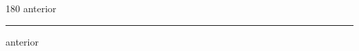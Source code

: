 
\begin{frame}
\begin{center}
\begin{turn}{180}
{\fontsize{2.5cm}{1em}\selectfont anterior}
\end{turn}
\vspace{1em}\par  
\hrule
\vspace{1em}\par  
{\fontsize{2.5cm}{1em}\selectfont anterior}
\end{center}
\end{frame}
